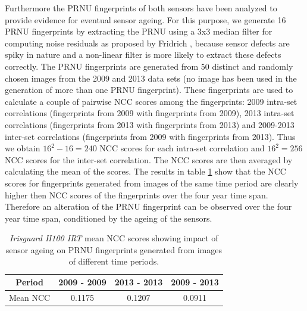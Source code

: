 \documentclass[10pt,twocolumn,letterpaper]{article}
\begin{document}
%

Furthermore the PRNU fingerprints of both sensors have been analyzed to provide evidence for eventual sensor ageing. For this purpose, we generate 16 PRNU fingerprints  by extracting the PRNU using a 3x3 median filter for computing noise residuals as proposed by Fridrich \cite{fridrich}, because sensor defects are spiky in nature and a non-linear filter is more likely to extract these defects correctly. The PRNU fingerprints are generated from 50 distinct and randomly chosen images from the 2009 and 2013 data sets (no image has been used in the generation of more than one PRNU fingerprint). 
These fingerprints are used to calculate a couple of pairwise NCC scores among the fingerprints: 2009 intra-set correlations (fingerprints from 2009 with fingerprints from 2009), 2013 intra-set correlations (fingerprints from 2013 with fingerprints from 2013) and 2009-2013 inter-set correlations (fingerprints from 2009 with fingerprints from 2013). Thus we obtain $16^{2}-16 = 240$ NCC scores for each intra-set correlation and $16^2 = 256$ NCC scores for the inter-set correlation. The NCC scores are then averaged by calculating the mean of the scores.
The results in table \ref{table:prnu_fp_corr} show that the NCC scores for fingerprints generated from images of the same time period are clearly higher then NCC scores of the fingerprints over the four year time span. Therefore an alteration of the PRNU fingerprint can be observed over the four year time span, conditioned by the ageing of the sensors.
 
 \begin{table} [hbt]
 \begin{center}
	\begin{tabular}{ c | c | c | c }
		   Period & 2009 - 2009 & 2013 - 2013 & 2009 - 2013 \\
		  \hline
			Mean NCC & 0.1175 & 0.1207  & 0.0911 
	\end{tabular}
	\vspace{2mm}
        \caption{\emph{Irisguard H100 IRT} mean NCC scores showing impact of sensor ageing on PRNU fingerprints generated from images of different time periods.}
    \label{table:prnu_fp_corr}
\end{center} 
\vspace{-4mm}
\end{table}
\end{document}

